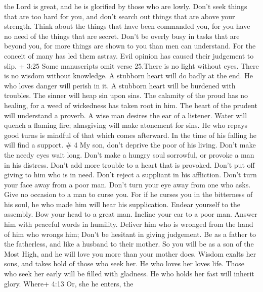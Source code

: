 the Lord is great, and he is glorified by those who are lowly.
 Don't seek things that are too hard for you, and don't
search out things that are above your strength.  Think
about the things that have been commanded you, for you have no need of
the things that are secret.  Don't be overly busy in tasks
that are beyond you, for more things are shown to you than men can
understand.  For the conceit of many has led them astray.
Evil opinion has caused their judgement to slip.  + 3:25
Some manuscripts omit verse 25.There is no light without eyes. There is
no wisdom without knowledge.  A stubborn heart will do
badly at the end. He who loves danger will perish in it.  A
stubborn heart will be burdened with troubles. The sinner will heap sin
upon sins.  The calamity of the proud has no healing, for a
weed of wickedness has taken root in him.  The heart of the
prudent will understand a proverb. A wise man desires the ear of a
listener.  Water will quench a flaming fire; almsgiving
will make atonement for sins.  He who repays good turns is
mindful of that which comes afterward. In the time of his falling he
will find a support. \# 4  My son, don't deprive the poor of
his living. Don't make the needy eyes wait long.  Don't make
a hungry soul sorrowful, or provoke a man in his distress. 
Don't add more trouble to a heart that is provoked. Don't put off giving
to him who is in need.  Don't reject a suppliant in his
affliction. Don't turn your face away from a poor man. 
Don't turn your eye away from one who asks. Give no occasion to a man to
curse you.  For if he curses you in the bitterness of his
soul, he who made him will hear his supplication.  Endear
yourself to the assembly. Bow your head to a great man. 
Incline your ear to a poor man. Answer him with peaceful words in
humility.  Deliver him who is wronged from the hand of him
who wrongs him; Don't be hesitant in giving judgement.  Be
as a father to the fatherless, and like a husband to their mother. So
you will be as a son of the Most High, and he will love you more than
your mother does.  Wisdom exalts her sons, and takes hold
of those who seek her.  He who loves her loves life. Those
who seek her early will be filled with gladness.  He who
holds her fast will inherit glory. Where+ 4:13 Or, she he enters, the
